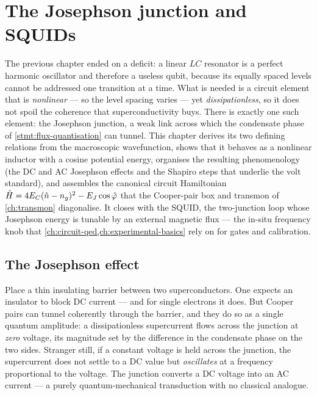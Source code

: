\chapter{The Josephson junction and SQUIDs}
\label{ch:josephson}

The previous chapter ended on a deficit: a linear $LC$ resonator is a
perfect harmonic oscillator and therefore a useless qubit, because its
equally spaced levels cannot be addressed one transition at a time.
What is needed is a circuit element that is \emph{nonlinear} --- so the
level spacing varies --- yet \emph{dissipationless}, so it does not
spoil the coherence that superconductivity buys. There is exactly one
such element: the Josephson junction, a weak link across which the
condensate phase of \cref{stmt:flux-quantisation} can tunnel. This
chapter derives its two defining relations from the macroscopic
wavefunction, shows that it behaves as a nonlinear inductor with a
cosine potential energy, organises the resulting phenomenology (the DC
and AC Josephson effects and the Shapiro steps that underlie the volt
standard), and assembles the canonical circuit Hamiltonian
$\hat{H}=4E_C(\hat{n}-n_g)^2-E_J\cos\hat{\varphi}$ that the Cooper-pair box
and transmon of \cref{ch:transmon} diagonalise. It closes with the
SQUID, the two-junction loop whose Josephson energy is tunable by an
external magnetic flux --- the in-situ frequency knob that
\cref{ch:circuit-qed,ch:experimental-basics} rely on for gates and
calibration.

\section{The Josephson effect}
\label{sec:josephson-effect}

\begin{phenomenon}
Place a thin insulating barrier between two superconductors. One
expects an insulator to block DC current --- and for single electrons
it does. But Cooper pairs can tunnel coherently through the barrier,
and they do so as a single quantum amplitude: a dissipationless
supercurrent flows across the junction at \emph{zero} voltage, its
magnitude set by the difference in the condensate phase on the two
sides. Stranger still, if a constant voltage is held across the
junction, the supercurrent does not settle to a DC value but
\emph{oscillates} at a frequency proportional to the voltage. The
junction converts a DC voltage into an AC current --- a purely
quantum-mechanical transduction with no classical analogue.
\end{phenomenon}

